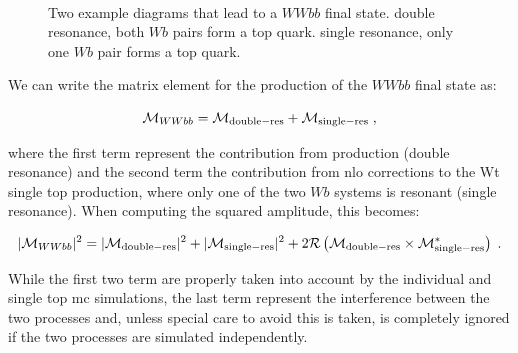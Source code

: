 \begin{figure}[h]
\centering 
{}$\;\;\;\;\;\;$
\caption{Two example diagrams that lead to a $WWbb$ final state.  double resonance, both $Wb$ pairs form a top quark.  single resonance, only one $Wb$ pair forms a top quark.}\label{fig:WWbb}
\end{figure}


We can write the matrix element for the production of the $WWbb$ final state as:

\begin{equation}
\mathcal{M}_{WWbb} = \mathcal{M}_{\rm{double-res}} + \mathcal{M}_{\rm{single-res}} \; ,
\end{equation}

\noindent where the first term represent the contribution from \ttbar production (double resonance) and the second term the contribution from 
\gls{nlo} corrections to the Wt single top production, where only one of the two $Wb$ systems is resonant (single resonance). 
When computing the squared amplitude, this becomes:

\begin{equation}
|\mathcal{M}_{WWbb}|^2 = |\mathcal{M}_{\rm{double-res}}|^2 + |\mathcal{M}_{\rm{single-res}}|^2 + 2 \mathcal{R}\left(\mathcal{M}_{\rm{double-res}}\times \mathcal{M}_{\rm{single-res}}^* \right) \; .
\end{equation}

While the first two term are properly taken into account by the individual \ttbar and single top \gls{mc} simulations, 
the last term represent the interference between the two processes and, unless special care to avoid this is taken, is completely ignored if the two processes are simulated independently. 

